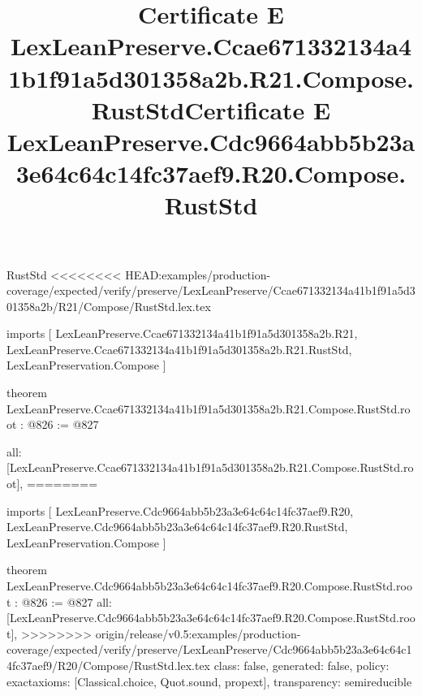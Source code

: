 \begin{lexlean}{RustStd}
<<<<<<<< HEAD:examples/production-coverage/expected/verify/preserve/LexLeanPreserve/Ccae671332134a41b1f91a5d301358a2b/R21/Compose/RustStd.lex.tex
\title{Certificate E LexLeanPreserve.Ccae671332134a41b1f91a5d301358a2b.R21.Compose.RustStd}
\begin{coremodule}
imports [
  LexLeanPreserve.Ccae671332134a41b1f91a5d301358a2b.R21,
  LexLeanPreserve.Ccae671332134a41b1f91a5d301358a2b.R21.RustStd,
  LexLeanPreservation.Compose
]

theorem LexLeanPreserve.Ccae671332134a41b1f91a5d301358a2b.R21.Compose.RustStd.root : @826 := @827 {
  all: [LexLeanPreserve.Ccae671332134a41b1f91a5d301358a2b.R21.Compose.RustStd.root],
========
\title{Certificate E LexLeanPreserve.Cdc9664abb5b23a3e64c64c14fc37aef9.R20.Compose.RustStd}
\begin{coremodule}
imports [
  LexLeanPreserve.Cdc9664abb5b23a3e64c64c14fc37aef9.R20,
  LexLeanPreserve.Cdc9664abb5b23a3e64c64c14fc37aef9.R20.RustStd,
  LexLeanPreservation.Compose
]

theorem LexLeanPreserve.Cdc9664abb5b23a3e64c64c14fc37aef9.R20.Compose.RustStd.root : @826 := @827 {
  all: [LexLeanPreserve.Cdc9664abb5b23a3e64c64c14fc37aef9.R20.Compose.RustStd.root],
>>>>>>>> origin/release/v0.5:examples/production-coverage/expected/verify/preserve/LexLeanPreserve/Cdc9664abb5b23a3e64c64c14fc37aef9/R20/Compose/RustStd.lex.tex
  class: false,
  generated: false,
  policy: exact{axioms: [Classical.choice, Quot.sound, propext]},
  transparency: semireducible
}


\end{coremodule}}
\end{coremodule}
\end{lexlean}
